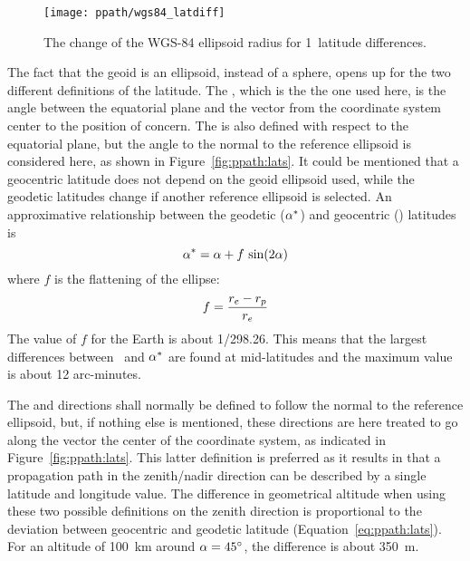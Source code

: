 \begin{figure}[!p]
 \begin{minipage}[c]{0.65\textwidth}
 \texttt{[image: ppath/wgs84\_latdiff]}
 \end{minipage}%
 \begin{minipage}[c]{0.35\textwidth}
  \caption{The change of the WGS-84 ellipsoid radius for  1\degree\ 
            latitude differences.}
  \label{fig:ppath:latdiff}
 \end{minipage}%
\end{figure}   



\label{sec:ppath:geolat}

The fact that the geoid is an ellipsoid, instead of a sphere, opens up
for the two different definitions of the latitude. The
, which is the the one used here, is the
angle between the equatorial plane and the vector from the coordinate
system center to the position of concern. The  is also defined with respect to the equatorial plane, but
the angle to the normal to the reference ellipsoid is considered here, as
shown in Figure~\ref{fig:ppath:lats}. It could be mentioned that a
geocentric latitude does not depend on the geoid ellipsoid used, while
the geodetic latitudes change if another reference ellipsoid is
selected. An approximative relationship between the geodetic
($\alpha^*$) and geocentric (\Lat) latitudes is \citep{montenbruck:00}
\begin{equation}
 \alpha^* = \alpha + f\,\sin(2\alpha)  
 \label{eq:ppath:lats}
\end{equation}
where $f$ is the flattening of the ellipse:
\begin{equation}
 f = \frac{r_{e}-r_{p}}{r_{e}}
 \label{eq:ppath:flattening}
\end{equation}
The value of $f$ for the Earth is about 1/298.26. This means that the
largest differences between \Lat\ and $\alpha^*$ are found at
mid-latitudes and the maximum value is about 12 arc-minutes.

The  and  directions shall normally be
defined to follow the normal to the reference ellipsoid, but, if
nothing else is mentioned, these directions are here treated to go
along the vector the center of the coordinate system, as indicated in
Figure~\ref{fig:ppath:lats}. This latter definition is preferred
as it results in that a propagation path in the zenith/nadir direction
can be described by a single latitude and longitude value. The
difference in geometrical altitude when using these two possible
definitions on the zenith direction is proportional to the deviation
between geocentric and geodetic latitude (Equation~\ref{eq:ppath:lats}).
For an altitude of 100~km around $\alpha=45^\circ$, the difference is
about 350~m.


